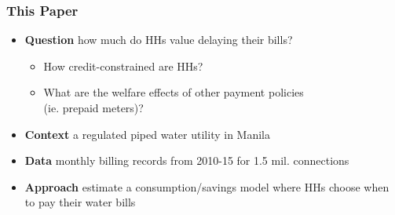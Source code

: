 \documentclass[aspectratio=149]{beamer}
\begin{document}
\begin{frame}
\frametitle{This Paper}

\begin{itemize}
\item \textbf{Question} \hspace{.5mm} how much do HHs value delaying their bills?
\vspace{.1cm}
\begin{itemize}
  \item How credit-constrained are HHs?
  \item What are the welfare effects of other payment policies \\ (ie. prepaid meters)?
\end{itemize}
\vspace{2mm}
\item \textbf{Context} \hspace{.5mm} a regulated piped water utility in Manila
\vspace{2mm}
\item \textbf{Data} \hspace{.5mm} monthly billing records from 2010-15 for 1.5 mil. connections
\vspace{2mm}
\item \textbf{Approach} \hspace{.5mm} estimate a consumption/savings model where HHs choose when to pay their water bills

\end{itemize}

\end{frame}

\end{document}
